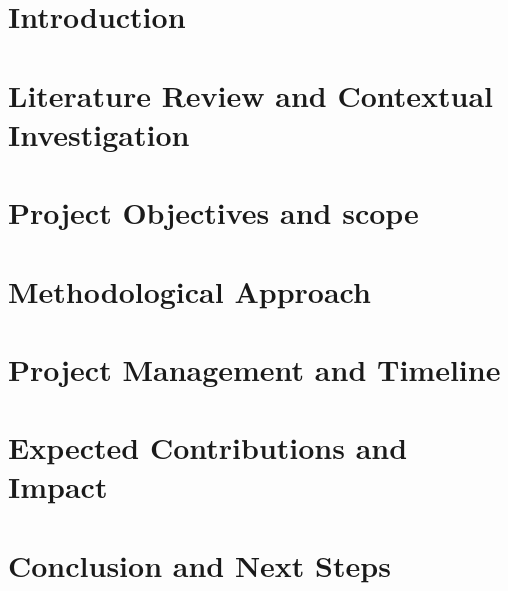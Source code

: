 \documentclass[12pt,a4paper,oneside]{report}
\begin{document}
\setcounter{page}{1}

\chapter{Introduction}
\label{chap:intro}


\chapter{Literature Review and Contextual Investigation}
\label{chap:literature-review-and-contextual-investigation}


\chapter{Project Objectives and scope}
\label{chap:project-objectives-and-scope}


\chapter{Methodological Approach}
\label{chap:methodological-approach}


\chapter{Project Management and Timeline}
\label{chap:project-management-and-timeline}


\chapter{Expected Contributions and Impact}
\label{chap:expected-contributions-and-impact}


\chapter{Conclusion and Next Steps}
\label{chap:conclusion-and-next-steps}


\clearpage

\end{document}
